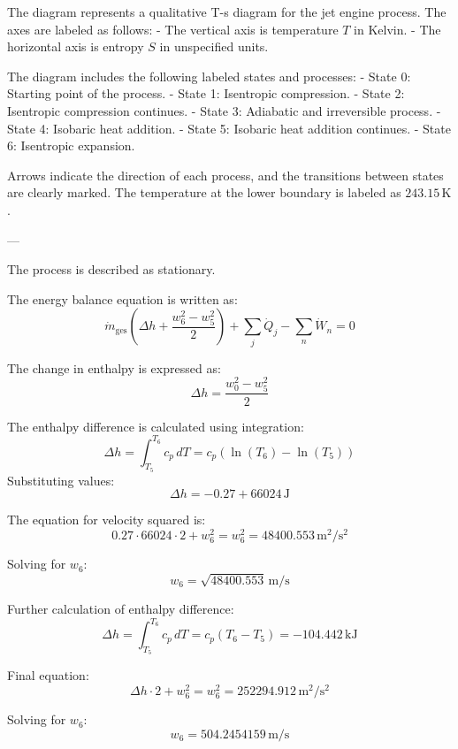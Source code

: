 The diagram represents a qualitative T-s diagram for the jet engine process. The axes are labeled as follows:  
- The vertical axis is temperature \( T \) in Kelvin.  
- The horizontal axis is entropy \( S \) in unspecified units.  

The diagram includes the following labeled states and processes:  
- State 0: Starting point of the process.  
- State 1: Isentropic compression.  
- State 2: Isentropic compression continues.  
- State 3: Adiabatic and irreversible process.  
- State 4: Isobaric heat addition.  
- State 5: Isobaric heat addition continues.  
- State 6: Isentropic expansion.  

Arrows indicate the direction of each process, and the transitions between states are clearly marked. The temperature at the lower boundary is labeled as \( 243.15 \, \text{K} \).  

---

The process is described as stationary.  

The energy balance equation is written as:  
\[
\dot{m}_{\text{ges}} \left( \Delta h + \frac{w_6^2 - w_5^2}{2} \right) + \sum_j \dot{Q}_j - \sum_n \dot{W}_n = 0
\]  

The change in enthalpy is expressed as:  
\[
\Delta h = \frac{w_0^2 - w_5^2}{2}
\]  

The enthalpy difference is calculated using integration:  
\[
\Delta h = \int_{T_5}^{T_6} c_p \, dT = c_p \left( \ln(T_6) - \ln(T_5) \right)
\]  
Substituting values:  
\[
\Delta h = -0.27 + 66024 \, \text{J}
\]  

The equation for velocity squared is:  
\[
0.27 \cdot 66024 \cdot 2 + w_6^2 = w_6^2 = 48400.553 \, \text{m}^2/\text{s}^2
\]  

Solving for \( w_6 \):  
\[
w_6 = \sqrt{48400.553} \, \text{m/s}
\]  

Further calculation of enthalpy difference:  
\[
\Delta h = \int_{T_5}^{T_6} c_p \, dT = c_p (T_6 - T_5) = -104.442 \, \text{kJ}
\]  

Final equation:  
\[
\Delta h \cdot 2 + w_6^2 = w_6^2 = 252294.912 \, \text{m}^2/\text{s}^2
\]  

Solving for \( w_6 \):  
\[
w_6 = 504.2454159 \, \text{m/s}
\]